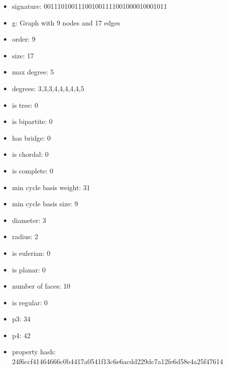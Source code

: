 \newpage
\begin{figure}
\end{figure}
\begin{itemize}
\item signature: 001110100111001001111001000010001011
\item g: Graph with 9 nodes and 17 edges
\item order: 9
\item size: 17
\item max degree: 5
\item degrees: 3,3,3,4,4,4,4,4,5
\item is tree: 0
\item is bipartite: 0
\item has bridge: 0
\item is chordal: 0
\item is complete: 0
\item min cycle basis weight: 31
\item min cycle basis size: 9
\item diameter: 3
\item radius: 2
\item is eulerian: 0
\item is planar: 0
\item number of faces: 10
\item is regular: 0
\item p3: 34
\item p4: 42
\item property hash: 24f6ccf41464666c0b4417a0541f13c6e6acdd229dc7a12fe6d58e4a25f47614
\end{itemize}
